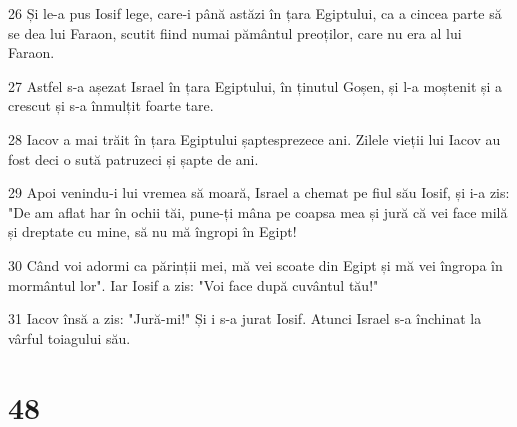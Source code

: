 \par 26 Și le-a pus Iosif lege, care-i până astăzi în țara Egiptului, ca a cincea parte să se dea lui Faraon, scutit fiind numai pământul preoților, care nu era al lui Faraon.
\par 27 Astfel s-a așezat Israel în țara Egiptului, în ținutul Goșen, și l-a moștenit și a crescut și s-a înmulțit foarte tare.
\par 28 Iacov a mai trăit în țara Egiptului șaptesprezece ani. Zilele vieții lui Iacov au fost deci o sută patruzeci și șapte de ani.
\par 29 Apoi venindu-i lui vremea să moară, Israel a chemat pe fiul său Iosif, și i-a zis: "De am aflat har în ochii tăi, pune-ți mâna pe coapsa mea și jură că vei face milă și dreptate cu mine, să nu mă îngropi în Egipt!
\par 30 Când voi adormi ca părinții mei, mă vei scoate din Egipt și mă vei îngropa în mormântul lor". Iar Iosif a zis: "Voi face după cuvântul tău!"
\par 31 Iacov însă a zis: "Jură-mi!" Și i s-a jurat Iosif. Atunci Israel s-a închinat la vârful toiagului său.

\chapter{48}

